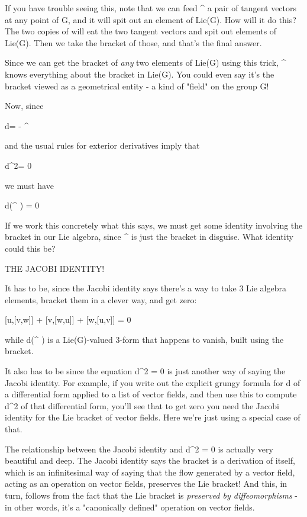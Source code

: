 If you have trouble seeing this, note that we can feed \omega  ^ \omega 
a pair of tangent vectors at any point of G, and it will spit out
an element of Lie(G).  How will it do this?  The two copies of \omega 
will eat the two tangent vectors and spit out elements of Lie(G).
Then we take the bracket of those, and that's the final answer.

Since we can get the bracket of \emph{any} two elements of Lie(G) using
this trick, \omega  ^ \omega  knows everything about the bracket in 
Lie(G).  You could even say it's the bracket viewed as a geometrical
entity - a kind of "field" on the group G!

Now, since 

d\omega  = - \omega  ^ \omega  

and the usual rules for exterior derivatives imply that

d^{2}\omega  = 0

we must have

d(\omega  ^ \omega ) = 0

If we work this concretely what this says, we must get some identity 
involving the bracket in our Lie algebra, since \omega  ^ \omega  is just 
the bracket in disguise.  What identity could this be?

THE JACOBI IDENTITY!

It has to be, since the Jacobi identity says there's a way to take
3 Lie algebra elements, bracket them in a clever way, and get zero:

[u,[v,w]] + [v,[w,u]] + [w,[u,v]] = 0

while d(\omega  ^ \omega ) is a Lie(G)-valued 3-form that happens to vanish,
built using the bracket.

It also has to be since the equation d^{2} = 0 is just another way
of saying the Jacobi identity.  For example, if you write out the
explicit grungy formula for d of a differential form applied to a 
list of vector fields, and then use this to compute d^{2} of that 
differential form, you'll see that to get zero you need the Jacobi
identity for the Lie bracket of vector fields.  Here we're just 
using a special case of that.

The relationship between the Jacobi identity and d^{2} = 0 is actually
very beautiful and deep.  The Jacobi identity says the bracket is
a derivation of itself, which is an infinitesimal way of saying that
the flow generated by a vector field, acting as an operation 
on vector fields, preserves
the Lie bracket!  And this, in turn, follows from the fact that the 
Lie bracket is \emph{preserved by diffeomorphisms} - in other words, it's 
a "canonically defined" operation on vector fields.

